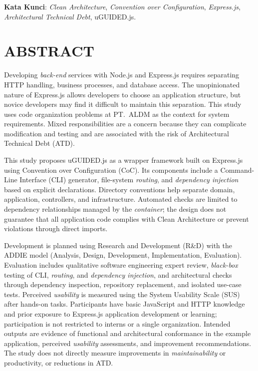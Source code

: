 \documentclass[12pt,a4paper,oneside]{report}
\begin{document}
\vspace{0.4cm}
\noindent\textbf{Kata Kunci}: \textit{Clean Architecture}, \textit{Convention over Configuration}, \textit{Express.js}, \textit{Architectural Technical Debt}, uGUIDED.js.

\newpage

\chapter*{ABSTRACT}
\begin{singlespace}
\begin{itshape}

Developing \textit{back-end} services with Node.js and Express.js requires separating HTTP handling, business processes, and database access. The unopinionated nature of Express.js allows developers to choose an application structure, but novice developers may find it difficult to maintain this separation. This study uses code organization problems at PT.\ ALDM as the context for system requirements. Mixed responsibilities are a concern because they can complicate modification and testing and are associated with the risk of Architectural Technical Debt (ATD).

This study proposes uGUIDED.js as a wrapper framework built on Express.js using Convention over Configuration (CoC). Its components include a Command-Line Interface (CLI) generator, file-system \textit{routing}, and \textit{dependency injection} based on explicit declarations. Directory conventions help separate domain, application, controllers, and infrastructure. Automated checks are limited to dependency relationships managed by the \textit{container}; the design does not guarantee that all application code complies with Clean Architecture or prevent violations through direct imports.

Development is planned using Research and Development (R\&D) with the ADDIE model (Analysis, Design, Development, Implementation, Evaluation). Evaluation includes qualitative software engineering expert review, \textit{black-box} testing of CLI, \textit{routing}, and \textit{dependency injection}, and architectural checks through dependency inspection, repository replacement, and isolated use-case tests. Perceived \textit{usability} is measured using the System Usability Scale (SUS) after hands-on tasks. Participants have basic JavaScript and HTTP knowledge and prior exposure to Express.js application development or learning; participation is not restricted to interns or a single organization. Intended outputs are evidence of functional and architectural conformance in the example application, perceived \textit{usability} assessments, and improvement recommendations. The study does not directly measure improvements in \textit{maintainability} or productivity, or reductions in ATD.

\end{itshape}
\end{singlespace}
\end{document}
